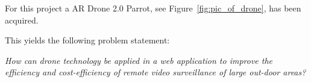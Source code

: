 For this project a AR Drone 2.0 Parrot, see Figure~\ref{fig:pic_of_drone}, has been acquired.

This yields the following problem statement:

\textit{How can drone technology be applied in a web application to improve the efficiency and cost-efficiency of remote video surveillance of large out-door areas?}